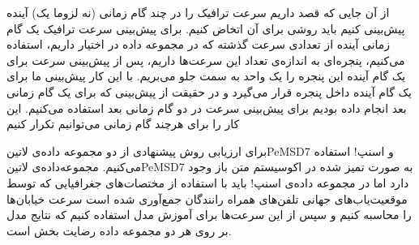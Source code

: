 از آن جایی که قصد داریم سرعت ترافیک را در چند گام زمانی (نه لزوما یک) آینده پیش‌بینی کنیم باید روشی برای آن اتخاض کنیم. برای پیش‌بینی سرعت ترافیک یک گام زمانی آینده از تعدادی سرعت گذشته که در مجموعه داده در اختیار داریم، استفاده می‌کنیم، پنجره‌ای به اندازه‌ی تعداد این سرعت‌ها داریم، پس از پیش‌بینی سرعت برای یک گام آینده این پنجره را یک واحد به سمت جلو می‌بریم. با این کار پیش‌بینی ما برای یک گام آینده داخل پنجره قرار می‌گیرد و در حقیقت از پیش‌بینی که برای یک گام زمانی بعد انجام داده بودیم برای پیش‌بینی سرعت در دو گام زمانی بعد استفاده می‌کنیم. این کار را برای هرچند گام زمانی می‌توانیم تکرار کنیم

برای ارزیابی روش پیشنهادی از دو مجموعه داده‌ی ‌لاتین{PeMSD7} و اسنپ! استفاده می‌کنیم. مجموعه‌داده‌ی ‌لاتین{PeMSD7} به صورت تمیز شده در اکوسیستم متن باز وجود دارد
اما در مجموعه داده‌ی اسنپ! باید با استفاده از مختصات‌های جغرافیایی که توسط موقعیت‌یاب‌های
جهانی تلفن‌های همراه رانندگان جمع‌آوری شده است سرعت خیابان‌ها را محاسبه کنیم و سپس از این سرعت‌ها برای آموزش مدل استفاده کنیم که نتایج مدل بر روی هر دو مجموعه داده رضایت بخش است.
